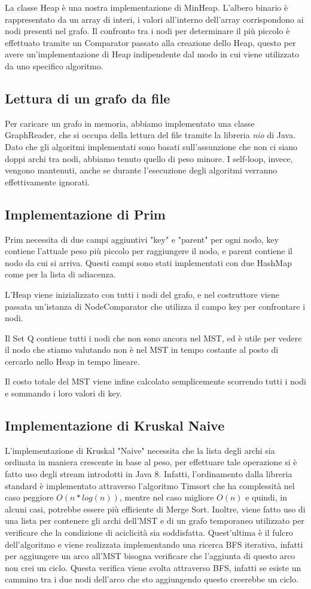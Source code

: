 La classe Heap è una nostra implementazione di MinHeap. L'albero binario è rappresentato da un array di interi, i valori all'interno dell'array corrispondono ai nodi presenti nel grafo. Il confronto tra i nodi per determinare il più piccolo è effettuato tramite un Comparator passato alla creazione dello Heap, questo per avere un'implementazione di Heap indipendente dal modo in cui viene utilizzato da uno specifico algoritmo.
\subsection{Lettura di un grafo da file}
Per caricare un grafo in memoria, abbiamo implementato una classe GraphReader, che si occupa della lettura del file tramite la libreria \textit{nio} di Java. Dato che gli algoritmi implementati sono basati sull'assunzione che non ci siano doppi archi tra nodi,
abbiamo tenuto quello di peso minore. I self-loop, invece, vengono mantenuti, anche se durante l'esecuzione degli algoritmi verranno effettivamente ignorati.
\subsection{Implementazione di Prim}
Prim necessita di due campi aggiuntivi "key" e "parent" per ogni nodo, key contiene l'attuale peso più piccolo per raggiungere il nodo, e parent contiene il nodo da cui si arriva. Questi campi sono stati implementati con due HashMap come per la lista di adiacenza.

L'Heap viene inizializzato con tutti i nodi del grafo, e nel costruttore viene passata un'istanza di NodeComparator che utilizza il campo key per confrontare i nodi.

Il Set Q contiene tutti i nodi che non sono ancora nel MST, ed è utile per vedere il nodo che stiamo valutando non è nel MST in tempo costante al posto di cercarlo nello Heap in tempo lineare.

Il costo totale del MST viene infine calcolato semplicemente scorrendo tutti i nodi e sommando i loro valori di key.
\subsection{Implementazione di Kruskal Naive}
L'implementazione di Kruskal "Naive" necessita che la lista degli archi sia ordinata in maniera crescente in base al peso, per effettuare tale operazione si è fatto uso degli stream introdotti in Java 8. Infatti, l'ordinamento dalla libreria standard è implementato attraverso l'algoritmo Timsort che ha complessità  nel caso peggiore $O(n \ast log(n))$, mentre nel caso migliore $O(n)$ e quindi, in alcuni casi, potrebbe essere più efficiente di Merge Sort. Inoltre, viene fatto uso di una lista per contenere gli archi dell'MST e di un grafo temporaneo utilizzato per verificare che la condizione di aciclicità sia soddisfatta. Quest'ultima è il fulcro dell'algoritmo e viene realizzata implementando una ricerca BFS iterativa, infatti per aggiungere un arco all'MST bisogna verificare che l'aggiunta di questo arco non crei un ciclo. Questa verifica viene svolta attraverso BFS, infatti se esiste un cammino tra i due nodi dell'arco che sto aggiungendo questo creerebbe un ciclo.
